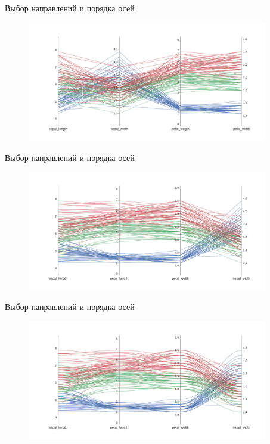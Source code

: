 \documentclass[fleqn, xcolor=x11names]{beamer}
\begin{document}
\begin{frame}{Выбор направлений и порядка осей}
    \begin{figure}[htb]
        \centering
        \includegraphics[width=10.5cm]{upgrade_1.pdf}
    \end{figure}
\end{frame}

\begin{frame}{Выбор направлений и порядка осей}
    \begin{figure}[htb]
        \centering
        \includegraphics[width=10.5cm]{upgrade_2.pdf}
    \end{figure}
\end{frame}

\begin{frame}{Выбор направлений и порядка осей}
    \begin{figure}[htb]
        \centering
        \includegraphics[width=10.5cm]{upgrade_3.pdf}
    \end{figure}
\end{frame}
\end{document}
